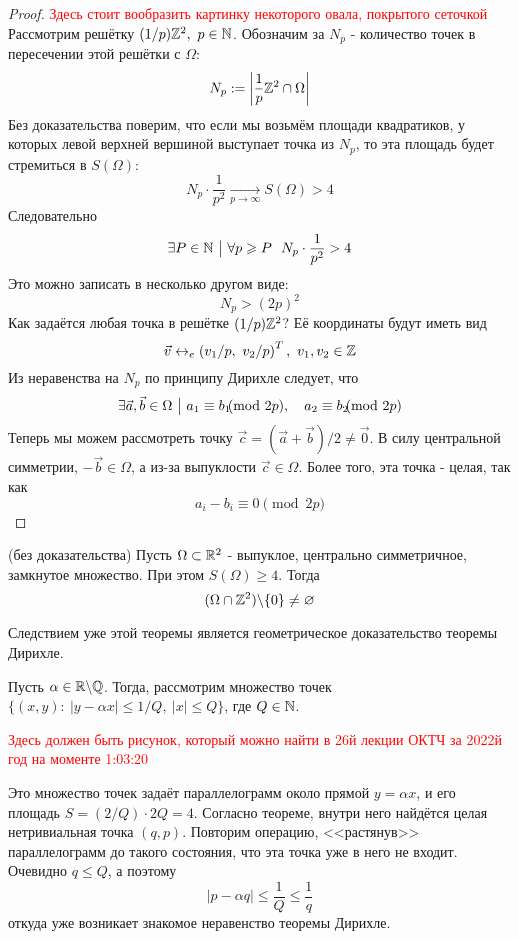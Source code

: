 \begin{proof}
	\textcolor{red}{Здесь стоит вообразить картинку некоторого овала, покрытого сеточкой}
	Рассмотрим решётку $(1/p)\mathbb{Z}^2,\ p \in \mathbb{N}$. Обозначим за $N_p$ - количество точек в пересечении этой решётки с $\Omega$:
	\[
		N_p := \left|\frac{1}{p}\mathbb{Z}^2 \cap \Omega\right|
	\]
	Без доказательства поверим, что если мы возьмём площади квадратиков, у которых левой верхней вершиной выступает точка из $N_p$, то эта площадь будет стремиться в $S(\Omega)$:
	\[
		N_p \cdot \frac{1}{p^2} \xrightarrow[p \to \infty]{} S(\Omega) > 4
	\]
	Следовательно
	\[
		\exists P \in \mathbb{N} \ \big|\  \forall p \geqslant P\ \ N_p \cdot \frac{1}{p^2} > 4
	\]
	Это можно записать в несколько другом виде:
	\[
		N_p > (2p)^2
	\]
	Как задаётся любая точка в решётке $(1/p)\mathbb{Z}^2$? Её координаты будут иметь вид
	\[
		\vec{v} \leftrightarrow_e \left(v_1 / p,\ v_2 / p\right)^T,\ v_1, v_2 \in \Z
	\]
	Из неравенства на $N_p$ по принципу Дирихле следует, что
	\[
		\exists \vec{a}, \vec{b} \in \Omega \such a_1 \equiv b_1\!\!\!\! \pmod {2p},\quad a_2 \equiv b_2\!\!\!\! \pmod {2p}
	\]
	Теперь мы можем рассмотреть точку $\vec{c} = (\vec{a} + \vec{b}) / 2 \neq \vec{0}$. В силу центральной симметрии, $-\vec{b} \in \Omega$, а из-за выпуклости $\vec{c} \in \Omega$. Более того, эта точка - целая, так как
	\[
		a_i - b_i \equiv 0 \pmod {2p}
	\]
\end{proof}

\begin{theorem} (без доказательства)
	Пусть $\Omega \subset \mathbb{R}^2$ - выпуклое, центрально симметричное, замкнутое множество. При этом $S(\Omega) \ge 4$. Тогда
	\[
		(\Omega \cap \mathbb{Z}^2) \backslash \{0\} \neq \varnothing
	\]
\end{theorem}

\begin{corollary}
	Следствием уже этой теоремы является геометрическое доказательство теоремы Дирихле.
	
	Пусть $\alpha \in \mathbb{R} \backslash \mathbb{Q}$. Тогда, рассмотрим множество точек $\{(x, y) \colon\ |y - \alpha x| \le 1 / Q,\ |x| \le Q\}$, где $Q \in \mathbb{N}$.
	
	\textcolor{red}{Здесь должен быть рисунок, который можно найти в 26й лекции ОКТЧ за 2022й год на моменте 1:03:20}
	
	Это множество точек задаёт параллелограмм около прямой $y = \alpha x$, и его площадь $S = (2 / Q) \cdot 2Q = 4$. Согласно теореме, внутри него найдётся целая нетривиальная точка $(q, p)$. Повторим операцию, <<растянув>> параллелограмм до такого состояния, что эта точка уже в него не входит. Очевидно $q \le Q$, а поэтому
	\[
		|p - \alpha q| \le \frac{1}{Q} \le \frac{1}{q}
	\]
	откуда уже возникает знакомое неравенство теоремы Дирихле.
\end{corollary}

